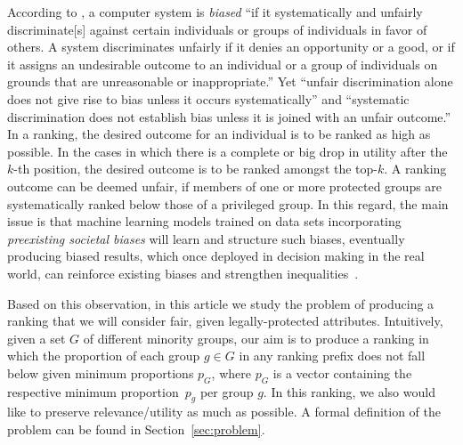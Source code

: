According to \citet{friedman1996bias}, a computer system is \emph{biased} ``if it systematically and unfairly discriminate[s] against certain individuals or groups of individuals in favor of others.
%
A system discriminates unfairly if it denies an opportunity or a good, or if it assigns an undesirable outcome to an individual or a group of individuals on grounds that are unreasonable or inappropriate.''
%
Yet ``unfair discrimination alone does not give rise to bias unless it occurs systematically'' and ``systematic discrimination does not establish bias unless it is joined with an unfair outcome.''
%
In a ranking, the desired outcome for an individual is to be ranked as high as possible. In the cases in which there is a complete or big drop in utility after the $k$-th position, the desired outcome is to be ranked amongst the top-$k$. A ranking outcome can be deemed unfair, if members of one or more protected groups are systematically ranked below those of a privileged group.
%
%
In this regard, the main issue is that machine learning models trained on data sets incorporating \textit{preexisting societal biases} will learn and structure such biases, eventually producing biased results, which once deployed in decision making in the real world, can reinforce existing biases and strengthen inequalities~\cite{oneil2016weapons}.
%
%

Based on this observation, in this article we study the problem of producing a ranking that we will consider fair, given legally-protected attributes.
%
%
Intuitively, given a set $G$ of different minority groups, our aim is to produce a ranking in which the proportion of each group $g \in G$ in any ranking prefix does not fall below given minimum proportions $p_G$, where $p_G$ is a vector containing the respective minimum proportion~$p_g$ per group $g$.
%
In this ranking, we also would like to preserve relevance/utility as much as possible.
%
A formal definition of the problem can be found in Section~\ref{sec:problem}.

